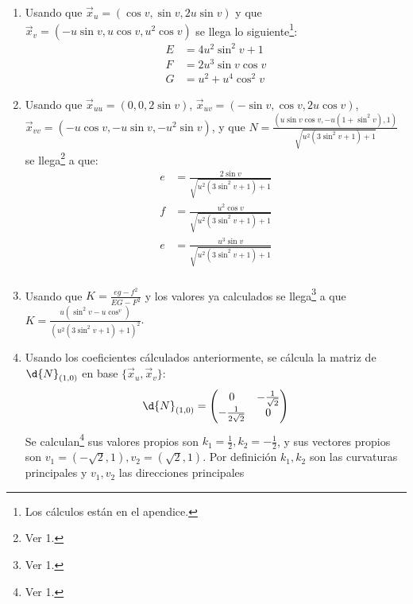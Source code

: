 \documentclass{homework}
\begin{document}
\begin{sol}
    \begin{enumerate}
        \item Usando que \(\vec{x}_u=(\cos v,\sin v,2u\sin v)\) y que \(\vec{x}_v=(-u\sin v,u\cos v,u^2\cos v)\) se llega lo siguiente\footnote{Los cálculos están en el apendice.}:
        \begin{align*}
            E&=4u^2\sin^2v+1\\
            F&=2u^3\sin v\cos v\\
            G&=u^2+u^4\cos^2 v
        \end{align*}
        \item Usando que \(\vec{x}_{uu}=(0,0,2\sin v)\), \(\vec{x}_{uv}=(-\sin v,\cos v, 2u\cos v)\), \(\vec{x}_{vv}=(-u\cos v,-u\sin v,-u^2\sin v)\), y que \(N=\frac{(u\sin v\cos v,-u(1+\sin^2 v),1)}{\sqrt{u^2(3\sin^2v+1)+1}}\) se llega\footnote{Ver 1.} a que:
        \begin{align*}
            e&=\frac{2\sin v}{\sqrt{u^2(3\sin^2v+1)+1}}\\
            f&=\frac{u^2\cos v}{\sqrt{u^2(3\sin^2v+1)+1}}\\
            e&=\frac{u^3\sin v}{\sqrt{u^2(3\sin^2v+1)+1}}\\
        \end{align*}
        \item Usando que \(K=\frac{eg-f^2}{EG-F^2}\) y los valores ya calculados se llega\footnote{Ver 1.} a que \(K=\frac{u(\sin^2v-u\cos^v)}{(u^2(3\sin^2v+1)+1)^2}\).
        \item Usando los coeficientes cálculados anteriormente, se cálcula la matriz de \(\d{N}_{(1,0)}\) en base \(\{\vec{x}_u,\vec{x}_v\}\):
        \begin{equation*}
            \d{N}_{(1,0)}=\begin{pmatrix}
                0 & -\frac1{\sqrt{2}}\\
                -\frac1{2\sqrt{2}} & 0\\
            \end{pmatrix}
        \end{equation*}
        Se calculan\footnote{Ver 1.} sus valores propios son \(k_1=\frac12,k_2=-\frac12\), y sus vectores propios son \(v_1=(-\sqrt{2},1),v_2=(\sqrt{2},1)\). Por definición \(k_1,k_2\) son las curvaturas principales y \(v_1,v_2\) las direcciones principales
    \end{enumerate}
\end{sol}
\end{document}
